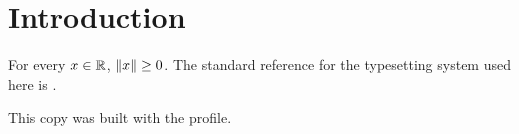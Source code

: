 \section{Introduction}
For every $x \in \mathbb{R}$, $\left\lVert x \right\rVert \ge 0$. The standard reference for the
typesetting system used here is \cite{knuth1984}.

This copy was built with the \texttt{\QuireProfile} profile.
